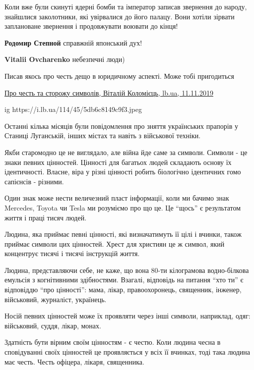 \begin{itemize}
Коли вже були скинуті ядерні бомби та імператор записав звернення до народу,
знайшлися заколотники, які увірвалися до його палацу. Вони хотіли зірвати
заплановане звернення і продовжувати воювати до кінця!

\begin{itemize} %
\textbf{Родомир Степной} справжній японський дух!

\textbf{Vitalii Ovcharenko} небезпечні люди)
\end{itemize} %

Писав якось про честь дещо в юридичному аспекті. Може тобі пригодиться

\href{https://lb.ua/blog/vitalii_kolomiets/441901_pro_chest_storozhu_simvoliv.html}{%
Про честь та сторожу символів, Віталій Коломієць, lb.ua, 11.11.2019%
}

\raggedcolumns
\begin{multicols}{2} %
\setlength{\parindent}{0pt}

\ifcmt
  ig https://i.lb.ua/114/45/5db6c8149c9f3.jpeg
\fi

Останні кілька місяців були повідомлення про зняття українських прапорів у
Станиці Луганській, інших містах та навіть з військової техніки.

Якби старомодно це не виглядало, але війна йде саме за символи. Символи - це
знаки певних цінностей. Цінності для багатьох людей складають основу їх
ідентичності. Власне, віра у різні цінності робить біологічно ідентичних гомо
сапієнсів - різними.

Один знак може нести величезний пласт інформації, коли ми бачимо знак Mercedes,
Toyota чи Tesla ми розуміємо про що це. Це \enquote{щось} є результатом життя і
праці тисяч людей.

Людина, яка приймає певні цінності, які визначатимуть її цілі і вчинки, також
приймає символи цих цінностей. Хрест для християн це ж символ, який концентрує
тисячі і тисячі інструкцій життя.

Людина, представляючи себе, не каже, що вона 80-ти кілограмова водно-білкова
емульсія з когнітивними здібностями. Взагалі, відповідь на питання \enquote{хто
ти} є відповіддю \enquote{про цінності}: мама, лікар, правоохоронець,
священник, інженер, військовий, журналіст, українець.

Носій певних цінностей може їх проявляти через інші символи, наприклад, одяг:
військовий, суддя, лікар, монах.

Здатність бути вірним своїм цінностям - є честю. Коли людина чесна в
сповідуванні своїх цінностей це проявляється у всіх її вчинках, тоді така
людина має честь. Честь офіцера, лікаря, священника.


\end{multicols}
\end{itemize}

